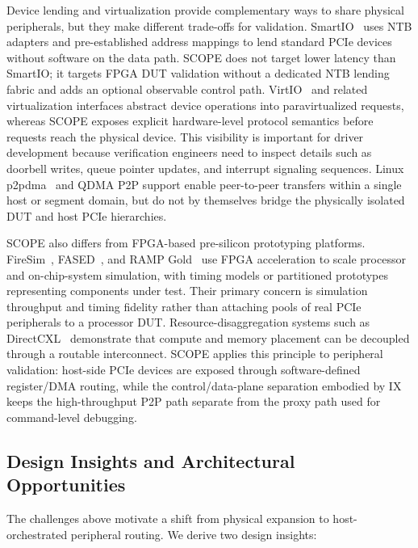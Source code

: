 \documentclass[10pt,conference,letterpaper]{IEEEtran}
\begin{document}
Device lending and virtualization provide complementary ways to share physical peripherals, but they make different trade-offs for validation. SmartIO~\cite{markussen2021smartio} uses NTB adapters and pre-established address mappings to lend standard PCIe devices without software on the data path. SCOPE does not target lower latency than SmartIO; it targets FPGA DUT validation without a dedicated NTB lending fabric and adds an optional observable control path. VirtIO~\cite{russell2008virtio} and related virtualization interfaces abstract device operations into paravirtualized requests, whereas SCOPE exposes explicit hardware-level protocol semantics before requests reach the physical device. This visibility is important for driver development because verification engineers need to inspect details such as doorbell writes, queue pointer updates, and interrupt signaling sequences. Linux p2pdma~\cite{linux_p2pdma} and QDMA P2P support enable peer-to-peer transfers within a single host or segment domain, but do not by themselves bridge the physically isolated DUT and host PCIe hierarchies.

SCOPE also differs from FPGA-based pre-silicon prototyping platforms. FireSim~\cite{karandikar2018firesim}, FASED~\cite{biancolin2019fased}, and RAMP Gold~\cite{tan2010rampgold} use FPGA acceleration to scale processor and on-chip-system simulation, with timing models or partitioned prototypes representing components under test. Their primary concern is simulation throughput and timing fidelity rather than attaching pools of real PCIe peripherals to a processor DUT. Resource-disaggregation systems such as DirectCXL~\cite{gouk2022directcxl} demonstrate that compute and memory placement can be decoupled through a routable interconnect. SCOPE applies this principle to peripheral validation: host-side PCIe devices are exposed through software-defined register/DMA routing, while the control/data-plane separation embodied by IX~\cite{belay2014ix} keeps the high-throughput P2P path separate from the proxy path used for command-level debugging.

\subsection{Design Insights and Architectural Opportunities}

The challenges above motivate a shift from physical expansion to host-orchestrated peripheral routing. We derive two design insights:
\end{document}
